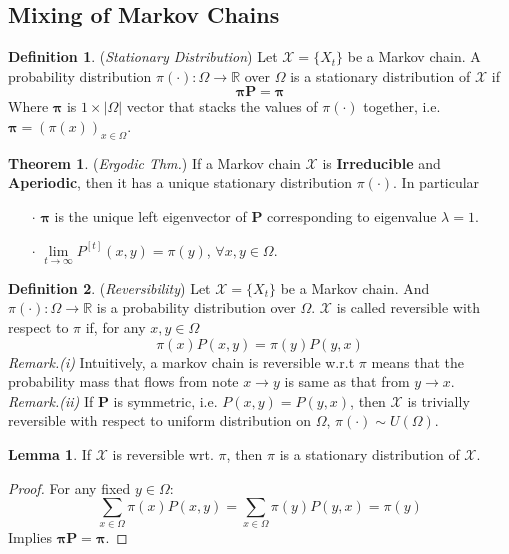 \documentclass[a4paper, 11pt]{article}
\theoremstyle{definition}
\newtheorem{theorem}{Theorem}
\newtheorem{lemma}{Lemma}
\newtheorem{definition}{Definition}
\begin{document}
\subsection{Mixing of Markov Chains}
\begin{definition} (\textit{Stationary Distribution}) Let $\mathcal{X}=\{X_t\}$ be a Markov chain. A probability distribution $\pi(\cdot): \Omega\to \mathbb{R}$ over $\Omega$ is a stationary distribution of $\mathcal{X}$ if
$$\bm{\pi}\bm{P}=\bm{\pi}$$
Where $\bm{\pi}$ is $1\times |\Omega|$ vector that stacks the values of $\pi(\cdot)$ together, i.e. $\bm{\pi}=(\pi(x))_{x\in \Omega}$.
\end{definition}

\begin{theorem} (\textit{Ergodic Thm.}) If a Markov chain $\mathcal{X}$ is \textbf{Irreducible} and \textbf{Aperiodic}, then it has a unique stationary distribution $\pi(\cdot)$. In particular
\begin{itemize}
	\item[$\cdot$] $\bm{\pi}$ is the unique left eigenvector of $\bm{P}$ corresponding to eigenvalue $\lambda = 1$.
	\item[$\cdot$] $\lim\limits_{t\rightarrow\infty}P^{[t]}(x,y)=\pi(y)$, $\forall x, y\in\Omega$.
\end{itemize}
\end{theorem}

\begin{definition} (\textit{Reversibility}) Let $\mathcal{X}=\{X_t\}$ be a Markov chain. And $\pi(\cdot): \Omega \to \mathbb{R}$ is a probability distribution over $\Omega$. $\mathcal{X}$ is called reversible with respect to $\pi$ if, for any $x,y\in \Omega$
$$\pi(x)P(x,y)=\pi(y)P(y,x)$$
\textit{Remark.(i)} Intuitively, a markov chain is reversible w.r.t $\pi$ means that the probability mass that flows from note $x \to y$ is same as that from $y \to x$.  \\
\textit{Remark.(ii)} If $\bm{P}$ is symmetric, i.e. $P(x,y)=P(y,x)$, then $\mathcal{X}$ is trivially reversible with respect to uniform distribution on $\Omega$, $\pi(\cdot)\sim U(\Omega)$.
\end{definition}

\begin{lemma} If $\mathcal{X}$ is reversible wrt. $\pi$, then $\pi$ is a stationary distribution of $\mathcal{X}$.
\end{lemma}
\begin{proof} For any fixed $y\in \Omega$:
$$\sum_{x\in\Omega}\pi(x)P(x,y)=\sum_{x\in\Omega}\pi(y)P(y,x)=\pi(y)$$
Implies $\bm{\pi}\bm{P}=\bm{\pi}$.
\end{proof}
\end{document}
